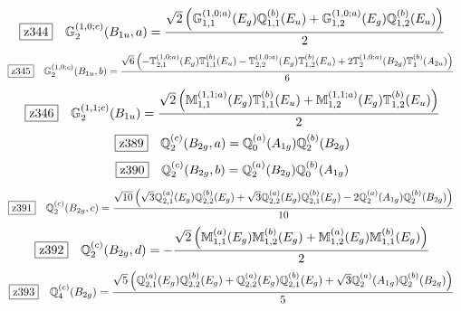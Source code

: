 \documentclass[fleqn,10pt,landscape]{jsarticle}
\begin{document}
\begin{dmath*}
\hspace*{3mm}\fbox{z344}\quad \mathbb{G}_{2}^{(1,0;c)}(B_{1u},a)=\frac{\sqrt{2} \left(\mathbb{G}_{1,1}^{(1,0;a)}(E_{g}) \mathbb{Q}_{1,1}^{(b)}(E_{u}) + \mathbb{G}_{1,2}^{(1,0;a)}(E_{g}) \mathbb{Q}_{1,2}^{(b)}(E_{u})\right)}{2}
\end{dmath*}
\begin{dmath*}
\hspace*{3mm}\fbox{z345}\quad \mathbb{G}_{2}^{(1,0;c)}(B_{1u},b)=\frac{\sqrt{6} \left(- \mathbb{T}_{2,1}^{(1,0;a)}(E_{g}) \mathbb{T}_{1,1}^{(b)}(E_{u}) - \mathbb{T}_{2,2}^{(1,0;a)}(E_{g}) \mathbb{T}_{1,2}^{(b)}(E_{u}) + 2 \mathbb{T}_{2}^{(1,0;a)}(B_{2g}) \mathbb{T}_{1}^{(b)}(A_{2u})\right)}{6}
\end{dmath*}
\begin{dmath*}
\hspace*{3mm}\fbox{z346}\quad \mathbb{G}_{2}^{(1,1;c)}(B_{1u})=\frac{\sqrt{2} \left(\mathbb{M}_{1,1}^{(1,1;a)}(E_{g}) \mathbb{T}_{1,1}^{(b)}(E_{u}) + \mathbb{M}_{1,2}^{(1,1;a)}(E_{g}) \mathbb{T}_{1,2}^{(b)}(E_{u})\right)}{2}
\end{dmath*}
\begin{dmath*}
\hspace*{3mm}\fbox{z389}\quad \mathbb{Q}_{2}^{(c)}(B_{2g},a)=\mathbb{Q}_{0}^{(a)}(A_{1g}) \mathbb{Q}_{2}^{(b)}(B_{2g})
\end{dmath*}
\begin{dmath*}
\hspace*{3mm}\fbox{z390}\quad \mathbb{Q}_{2}^{(c)}(B_{2g},b)=\mathbb{Q}_{2}^{(a)}(B_{2g}) \mathbb{Q}_{0}^{(b)}(A_{1g})
\end{dmath*}
\begin{dmath*}
\hspace*{3mm}\fbox{z391}\quad \mathbb{Q}_{2}^{(c)}(B_{2g},c)=\frac{\sqrt{10} \left(\sqrt{3} \mathbb{Q}_{2,1}^{(a)}(E_{g}) \mathbb{Q}_{2,2}^{(b)}(E_{g}) + \sqrt{3} \mathbb{Q}_{2,2}^{(a)}(E_{g}) \mathbb{Q}_{2,1}^{(b)}(E_{g}) - 2 \mathbb{Q}_{2}^{(a)}(A_{1g}) \mathbb{Q}_{2}^{(b)}(B_{2g})\right)}{10}
\end{dmath*}
\begin{dmath*}
\hspace*{3mm}\fbox{z392}\quad \mathbb{Q}_{2}^{(c)}(B_{2g},d)=- \frac{\sqrt{2} \left(\mathbb{M}_{1,1}^{(a)}(E_{g}) \mathbb{M}_{1,2}^{(b)}(E_{g}) + \mathbb{M}_{1,2}^{(a)}(E_{g}) \mathbb{M}_{1,1}^{(b)}(E_{g})\right)}{2}
\end{dmath*}
\begin{dmath*}
\hspace*{3mm}\fbox{z393}\quad \mathbb{Q}_{4}^{(c)}(B_{2g})=\frac{\sqrt{5} \left(\mathbb{Q}_{2,1}^{(a)}(E_{g}) \mathbb{Q}_{2,2}^{(b)}(E_{g}) + \mathbb{Q}_{2,2}^{(a)}(E_{g}) \mathbb{Q}_{2,1}^{(b)}(E_{g}) + \sqrt{3} \mathbb{Q}_{2}^{(a)}(A_{1g}) \mathbb{Q}_{2}^{(b)}(B_{2g})\right)}{5}
\end{dmath*}
\end{document}
